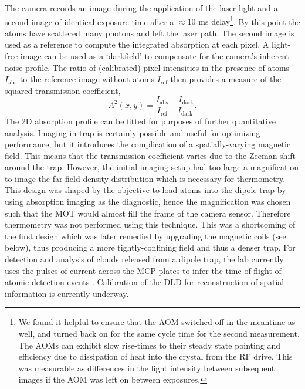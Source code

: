 	The camera records an image during the application of the laser light and a second image of identical exposure time after a {$\approx$10 ms delay}\footnote{We found it helpful to ensure that the AOM switched off in the meantime as well, and turned back on for the same cycle time for the second measurement.
	The AOMs can exhibit slow rise-times to their steady state pointing and efficiency due to dissipation of heat into the crystal from the RF drive.
	This was measurable as differences in the light intensity between subsequent images if the AOM was left on between exposures.}.
	By this point the atoms have scattered many photons and left the laser path.
	The second image is used as a reference to compute the integrated absorption at each pixel.
	A light-free image can be used as a `darkfield' to compensate for the camera's inherent noise profile.
	The ratio of (calibrated) pixel intensities in the presence of atoms $I_\textrm{abs}$ to the reference image without atoms $I_\textrm{ref}$ then provides a measure of the squared transmission coefficient,
	\begin{equation}
	A^2(x,y)=\frac{I_\textrm{abs}-I_\textrm{dark}}{I_\textrm{ref}-I_\textrm{dark}}.
	\end{equation}
	The 2D absorption profile can be fitted for purposes of further quantitative analysis. 
	Imaging in-trap is certainly possible and useful for optimizing performance, but it introduces the complication of a spatially-varying magnetic field.
	This means that the transmission coefficient varies due to the Zeeman shift around the trap.
	However, the initial imaging setup had too large a magnification to image the far-field density distribution which is necessary for thermometry.
	This design was shaped by the objective to load atoms into the dipole trap by using absorption imaging as the diagnostic, hence the magnification was chosen such that the MOT would almost fill the frame of the camera sensor.
	Therefore thermometry was not performed using this technique. 
	This was a shortcoming of the first design which was later remedied by upgrading the magnetic coils (see below), thus producing a more tightly-confining field and thus a denser trap.
	For detection and analysis of clouds released from a dipole trap, the lab currently uses the pulses of current across the MCP plates to infer the time-of-flight of atomic detection events \cite{Abbas21}.
	Calibration of the DLD for reconstruction of spatial information is currently underway.

